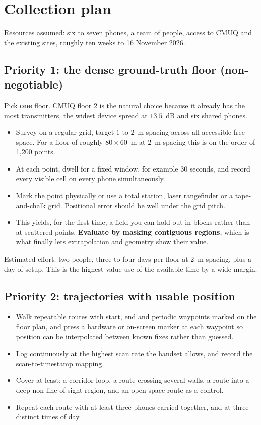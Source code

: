 \documentclass[11pt,a4paper]{article}
\begin{document}
\section{Collection plan}

Resources assumed: six to seven phones, a team of people, access to CMUQ and the existing
sites, roughly ten weeks to 16 November 2026.

\subsection{Priority 1: the dense ground-truth floor (non-negotiable)}

Pick \textbf{one} floor. CMUQ floor 2 is the natural choice because it already has the
most transmitters, the widest device spread at $13.5$~dB and six shared phones.

\begin{itemize}
\item Survey on a regular grid, target $1$ to $2$~m spacing across all accessible free
space. For a floor of roughly $80\times60$~m at $2$~m spacing this is on the order of
1{,}200 points.
\item At each point, dwell for a fixed window, for example 30 seconds, and record every
visible cell on every phone simultaneously.
\item Mark the point physically or use a total station, laser rangefinder or a
tape-and-chalk grid. Positional error should be well under the grid pitch.
\item This yields, for the first time, a field you can hold out in blocks rather than at
scattered points. \textbf{Evaluate by masking contiguous regions}, which is what
finally lets extrapolation and geometry show their value.
\end{itemize}

Estimated effort: two people, three to four days per floor at 2~m spacing, plus a day of
setup. This is the highest-value use of the available time by a wide margin.

\subsection{Priority 2: trajectories with usable position}

\begin{itemize}
\item Walk repeatable routes with start, end and periodic waypoints marked on the floor
plan, and press a hardware or on-screen marker at each waypoint so position can be
interpolated between known fixes rather than guessed.
\item Log continuously at the highest scan rate the handset allows, and record the
scan-to-timestamp mapping.
\item Cover at least: a corridor loop, a route crossing several walls, a route into a
deep non-line-of-sight region, and an open-space route as a control.
\item Repeat each route with at least three phones carried together, and at three
distinct times of day.
\end{itemize}
\end{document}
